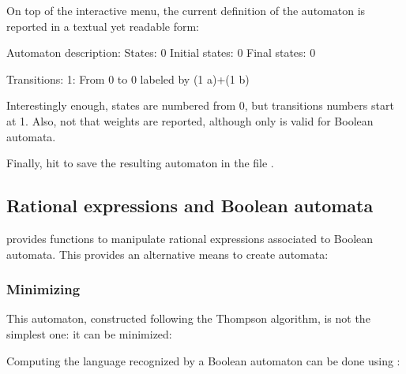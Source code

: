 On top of the interactive menu, the current definition of the
automaton is reported in a textual yet readable form:

\begin{shell}
Automaton description:
  States: 0
  Initial states: 0
  Final states: 0

  Transitions:
    1: From 0 to 0 labeled by (1 a)+(1 b)
\end{shell}

\noindent
Interestingly enough, states are numbered from 0, but transitions
numbers start at 1.  Also, not that weights are reported, although
only  is valid for Boolean automata.

Finally, hit  to save the resulting automaton in the file
.


\subsection{Rational expressions and Boolean automata}

\Vauc provides functions to manipulate rational expressions associated
to Boolean automata.  This provides an alternative means to create
automata:

\begin{center}
\end{center}

\subsubsection{Minimizing}

This automaton, constructed following the Thompson algorithm, is not
the simplest one: it can be minimized:

\begin{center}
\end{center}

\bigskip

Computing the language recognized by a Boolean automaton can be done
using :


